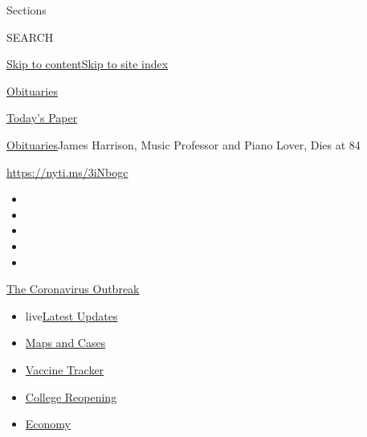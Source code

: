 Sections

SEARCH

\protect\hyperlink{site-content}{Skip to
content}\protect\hyperlink{site-index}{Skip to site index}

\href{https://www.nytimes3xbfgragh.onion/section/obituaries}{Obituaries}

\href{https://myaccount.nytimes3xbfgragh.onion/auth/login?response_type=cookie\&client_id=vi}{}

\href{https://www.nytimes3xbfgragh.onion/section/todayspaper}{Today's
Paper}

\href{/section/obituaries}{Obituaries}\textbar{}James Harrison, Music
Professor and Piano Lover, Dies at 84

\url{https://nyti.ms/3iNbogc}

\begin{itemize}
\item
\item
\item
\item
\item
\end{itemize}

\href{https://www.nytimes3xbfgragh.onion/news-event/coronavirus?action=click\&pgtype=Article\&state=default\&region=TOP_BANNER\&context=storylines_menu}{The
Coronavirus Outbreak}

\begin{itemize}
\tightlist
\item
  live\href{https://www.nytimes3xbfgragh.onion/2020/08/04/world/coronavirus-covid-19.html?action=click\&pgtype=Article\&state=default\&region=TOP_BANNER\&context=storylines_menu}{Latest
  Updates}
\item
  \href{https://www.nytimes3xbfgragh.onion/interactive/2020/us/coronavirus-us-cases.html?action=click\&pgtype=Article\&state=default\&region=TOP_BANNER\&context=storylines_menu}{Maps
  and Cases}
\item
  \href{https://www.nytimes3xbfgragh.onion/interactive/2020/science/coronavirus-vaccine-tracker.html?action=click\&pgtype=Article\&state=default\&region=TOP_BANNER\&context=storylines_menu}{Vaccine
  Tracker}
\item
  \href{https://www.nytimes3xbfgragh.onion/2020/08/02/us/covid-college-reopening.html?action=click\&pgtype=Article\&state=default\&region=TOP_BANNER\&context=storylines_menu}{College
  Reopening}
\item
  \href{https://www.nytimes3xbfgragh.onion/live/2020/08/03/business/stock-market-today-coronavirus?action=click\&pgtype=Article\&state=default\&region=TOP_BANNER\&context=storylines_menu}{Economy}
\end{itemize}

